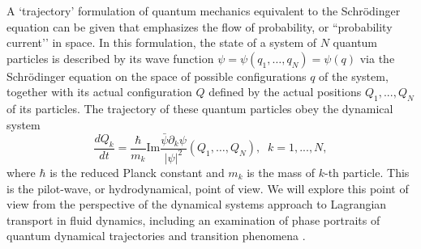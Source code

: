\documentclass[11pt]{NSFamsart}
\begin{document}

\smallskip
{}   A `trajectory'  formulation of quantum mechanics  equivalent to the Schr\"{o}dinger equation can be given \cite{Bohmian, Holland1993TheQT} that emphasizes the flow of probability, or ``probability current’’ in space. 
In this formulation, the state of a system of $N$ quantum particles is described by its wave function $\psi=\psi(q_1,…,q_N)=\psi(q)$ via the Schr\"{o}dinger equation  on the space of possible configurations $q$ of the system, together with its actual configuration $Q$ defined by the actual positions $Q_1,...,Q_N$ of its particles. The trajectory of these quantum particles obey the dynamical system
$$
\frac{dQ_k}{dt}= \frac{\hbar}{m_k} \text{Im} \frac{\bar\psi  \partial_k \psi}{|\psi|^2}(Q_1,…,Q_N),\;\; k=1, ..., N,  $$
where $\hbar$ is the reduced Planck constant and $m_k$ is the mass of $k$-th particle.
This is the pilot-wave, or hydrodynamical, point of view. We will explore this point of view from the perspective of the dynamical systems approach to Lagrangian transport in fluid dynamics, including an examination of phase portraits of quantum dynamical trajectories \cite{Berndl1995OnTG} and transition phenomena \cite{waalkens2007wigner,Micha2006QuantumDW, Dittrich2016}. 



  
\end{document}
